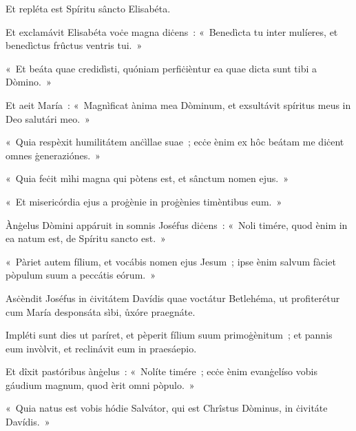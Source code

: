 Et repléta est Spíritu sâncto Elisabéta. 

Et exclamávit Elisabéta voċe magna diċens~: «~Benedìcta tu inter mulíeres, et benedìctus frûctus ventris tui.~» 

«~Et beáta quae credidìsti, quóniam perfiċièntur ea quae dicta sunt tibi a Dòmino.~» 

Et aeit María~: «~Magnìficat ànima mea Dòminum, et exsultávit spíritus meus in Deo salutári meo.~» 

«~Quia respèxit humilitátem anċìllae suae~; ecċe ènim ex hôc beátam me diċent omnes ġeneraziónes.~» 

«~Quia feċit mìhi magna qui pòtens est, et sânctum nomen ejus.~» 

«~Et misericórdia ejus a proġènie in proġènies timèntibus eum.~» 

\mysteryEnd
{}

Ànġelus Dòmini appáruit in somnis Joséfus diċens~: «~Noli timére, quod ènim in ea natum est, de Spíritu sancto est.~» 

«~Pàriet autem fílium, et vocábis nomen ejus Jesum~; ipse ènim salvum fàciet pòpulum suum a peccátis eórum.~» 

Asċèndit Joséfus in ċivitátem Davídis quae voctátur Betlehéma, ut profiterétur cum María desponsáta sìbi, ůxóre praegnáte. 

Impléti sunt dies ut paríret, et pèperit fílium suum primoġènitum~; et pannis eum invòlvit, et reclinávit eum in praesáepio. 

Et dîxit pastóribus ànġelus~: «~Nolíte timére~; ecċe ènim evanġelíso vobis gáudium magnum, quod èrit omni pòpulo.~» 

«~Quia natus est vobis hódie Salvátor, qui est Chrîstus Dòminus, in ċivitáte Davídis.~» 

